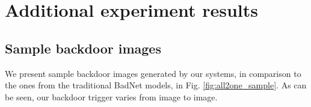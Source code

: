 \documentclass{article}
\begin{document}
\section{Additional experiment results}

\subsection{Sample backdoor images}
We present sample backdoor images generated by our systems, in comparison to the ones from the traditional BadNet models, in Fig. \ref{fig:all2one_sample}. As can be seen, our backdoor trigger varies from image to image.

\begin{figure}[t]
\centering
{}
\hspace{2mm}
\\
\vskip 0.05in


\end{figure}
\end{document}
